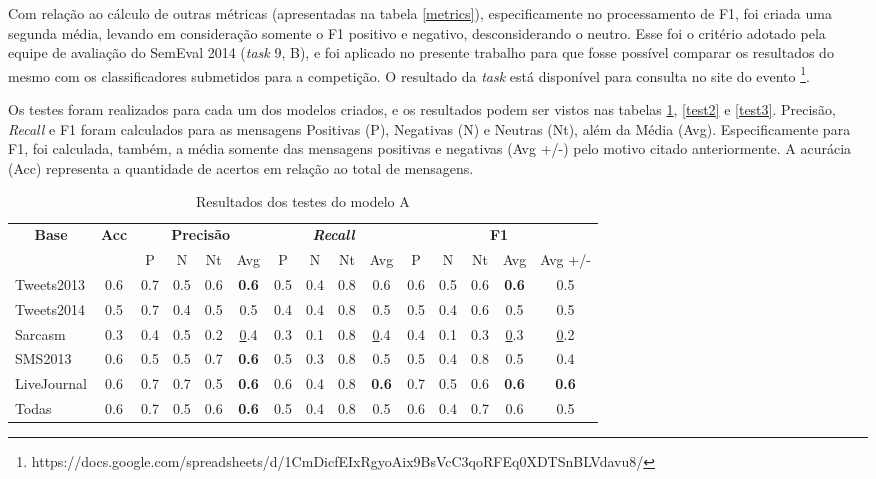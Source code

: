 \documentclass[12pt]{article}
\begin{document}
Com relação ao cálculo de outras métricas (apresentadas na tabela \ref{metrics}), especificamente no processamento de F1, foi criada uma segunda média, levando em consideração somente o F1 positivo e negativo, desconsiderando o neutro. Esse foi o critério adotado pela equipe de avaliação do SemEval 2014 (\emph{task} 9, B), e foi aplicado no presente trabalho para que fosse possível comparar os resultados do mesmo com os classificadores submetidos para a competição. O resultado da \emph{task} está disponível para consulta no site do evento \footnote{https://docs.google.com/spreadsheets/d/1CmDicfEIxRgyoAix9BsVcC3qoRFEq0XDTSnBLVdavu8/}.

Os testes foram realizados para cada um dos modelos criados, e os resultados podem ser vistos nas tabelas \ref{test1}, \ref{test2} e \ref{test3}. Precisão, \emph{Recall} e F1 foram calculados para as mensagens Positivas (P), Negativas (N) e Neutras (Nt), além da Média (Avg). Especificamente para F1, foi calculada, também, a média somente das mensagens positivas e negativas (Avg +/-) pelo motivo citado anteriormente. A acurácia (Acc) representa a quantidade de acertos em relação ao total de mensagens.

\begin{table}[H]
\centering
\begin{adjustwidth}{-1cm}{}
\begin{tabular}{lcccccccccccccc}
\multicolumn{1}{c}{\textbf{Base}} & \textbf{Acc} & \multicolumn{4}{c}{\textbf{Precisão}} & \multicolumn{4}{c}{\textit{\textbf{Recall}}} & \multicolumn{5}{c}{\textbf{F1}} \\
 &  & \multicolumn{1}{c|}{P} & \multicolumn{1}{c|}{N} & \multicolumn{1}{c|}{Nt} & Avg & \multicolumn{1}{c|}{P} & \multicolumn{1}{c|}{N} & \multicolumn{1}{c|}{Nt} & Avg & \multicolumn{1}{c|}{P} & \multicolumn{1}{c|}{N} & \multicolumn{1}{c|}{Nt} & \multicolumn{1}{c|}{Avg} & Avg +/- \\
Tweets2013 & 0.6 & 0.7 & 0.5 & 0.6 & \textbf{0.6} & 0.5 & 0.4 & 0.8 & 0.6 & 0.6 & 0.5 & 0.6 &  \textbf{0.6} & 0.5 \\ \hline
Tweets2014 & 0.5 & 0.7 & 0.4 & 0.5 & 0.5 & 0.4 & 0.4 & 0.8 & 0.5 & 0.5 & 0.4 & 0.6 & 0.5 & 0.5 \\ \hline
Sarcasm & 0.3 & 0.4 & 0.5 & 0.2 & {\ul0.4} & 0.3 & 0.1 & 0.8 & {\ul0.4} & 0.4 & 0.1 & 0.3 & {\ul0.3} & {\ul0.2} \\ \hline
SMS2013 & 0.6 & 0.5 & 0.5 & 0.7 & \textbf{0.6} & 0.5 & 0.3 & 0.8 & 0.5 & 0.5 & 0.4 & 0.8 & 0.5 & 0.4 \\ \hline
LiveJournal & 0.6 & 0.7 & 0.7 & 0.5 & \textbf{0.6} & 0.6 & 0.4 & 0.8 & \textbf{0.6} & 0.7 & 0.5 & 0.6 & \textbf{0.6} & \textbf{0.6} \\ \hline
Todas & 0.6 & 0.7 & 0.5 & 0.6 & \textbf{0.6} & 0.5 & 0.4 & 0.8 & 0.5 & 0.6 & 0.4 & 0.7 & 0.6 & 0.5 \\ \hline
\end{tabular}
\caption{Resultados dos testes do modelo A}
\label{test1}
\end{adjustwidth}
\end{table}
\end{document}
